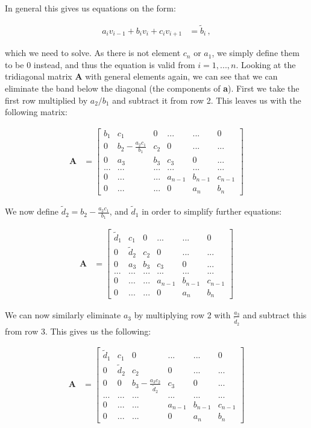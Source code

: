 \documentclass[english,notitlepage,reprint,nofootinbib]{revtex4-1}  %
\begin{document}
In general this gives us equations on the form:

\begin{align*}
a_i v_{i-1} + b_i v_i + c_i v_{i+1} &= \tilde{b}_i \, ,
\end{align*}

which we need to solve. As there is not element $c_n$ or $a_1$, we simply define them to be 0 instead, and thus the equation is valid from $i = 1,...,n$. Looking at the tridiagonal matrix \textbf{A} with general elements again, we can see that we can eliminate the band below the diagonal (the components of \textbf{a}). First we take the first row multiplied by $a_2/b_1$ and subtract it from row 2. This leaves us with the following matrix:

\begin{align*}
\textbf{A} &= \begin{bmatrix}
b_1 & c_1 & 0 & ... & ... & 0 \\
0 & b_2 - \frac{a_2c_1}{b_1} & c_2 & 0 & ... & ... \\
0 & a_3 & b_3 & c_3 & 0 & ... \\
... & ... & ... & ... & ... & ... \\
0 & ... & ... & a_{n-1} & b_{n-1} & c_{n-1} \\
0 & ... & ... & 0 & a_{n} & b_n
\end{bmatrix}
\end{align*}

We now define $\tilde{d}_2 = b_2 - \frac{a_2c_1}{b_1}$, and $\tilde{d}_1$ in order to simplify further equations:

\begin{align*}
\textbf{A} &= \begin{bmatrix}
\tilde{d}_1 & c_1 & 0 & ... & ... & 0 \\
0 & \tilde{d}_2 & c_2 & 0 & ... & ... \\
0 & a_3 & b_3 & c_3 & 0 & ... \\
... & ... & ... & ... & ... & ... \\
0 & ... & ... & a_{n-1} & b_{n-1} & c_{n-1} \\
0 & ... & ... & 0 & a_{n} & b_n
\end{bmatrix}
\end{align*}

We can now similarly eliminate $a_3$ by multiplying row 2 with $\frac{a_3}{\tilde{d}_2}$ and subtract this from row 3. This gives us the following:

\begin{align*}
\textbf{A} &= \begin{bmatrix}
\tilde{d}_1 & c_1 & 0 & ... & ... & 0 \\
0 & \tilde{d}_2 & c_2 & 0 & ... & ... \\
0 & 0 & b_3 - \frac{a_3 c_2}{\tilde{d}_2} & c_3 & 0 & ... \\
... & ... & ... & ... & ... & ... \\
0 & ... & ... & a_{n-1} & b_{n-1} & c_{n-1} \\
0 & ... & ... & 0 & a_{n} & b_n
\end{bmatrix}
\end{align*}
\end{document}
